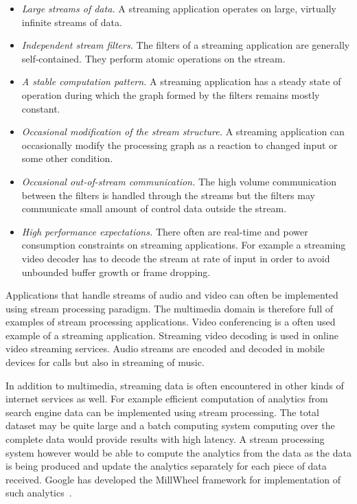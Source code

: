 \begin{itemize}
    \item \textit{Large streams of data.} A streaming application operates on large, virtually infinite streams of data.
    \item \textit{Independent stream filters.} The filters of a streaming application are generally self-contained. They perform atomic operations on the stream.
    \item \textit{A stable computation pattern.} A streaming application has a steady state of operation during which the graph formed by the filters remains mostly constant.
    \item \textit{Occasional modification of the stream structure.} A streaming application can occasionally modify the processing graph as a reaction to changed input or some other condition.
    \item \textit{Occasional out-of-stream communication.} The high volume communication between the filters is handled through the streams but the filters may communicate small amount of control data outside the stream.
    \item \textit{High performance expectations.} There often are real-time and power consumption constraints on streaming applications. For example a streaming video decoder has to decode the stream at rate of input in order to avoid unbounded buffer growth or frame dropping.
\end{itemize}

Applications that handle streams of audio and video can often be implemented using stream processing paradigm. The multimedia domain is therefore full of examples of stream processing applications. Video conferencing is a often used example of a streaming application. Streaming video decoding is used in online video streaming services. Audio streams are encoded and decoded in mobile devices for calls but also in streaming of music.

In addition to multimedia, streaming data is often encountered in other kinds of internet services as well. For example efficient computation of analytics from search engine data can be implemented using stream processing. The total dataset may be quite large and a batch computing system computing over the complete data would provide results with high latency. A stream processing system however would be able to compute the analytics from the data as the data is being produced and update the analytics separately for each piece of data received. Google has developed the MillWheel framework for implementation of such analytics~\cite{tyler2013millwheel}.

